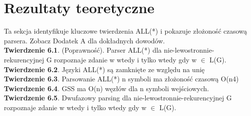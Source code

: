 \section{Rezultaty teoretyczne}
Ta sekcja identyfikuje kluczowe twierdzenia ALL(*) i pokazuje złożoność czasową parsera.
Zobacz Dodatek A dla dokładnych dowodów.
\\
\textbf{Twierdzenie 6.1}. (Poprawność). Parser ALL(*) dla nie-lewostronnie-rekurencyjnej
G rozpoznaje zdanie w wtedy i tylko wtedy gdy w $\in$ L(G).
\\
\textbf{Twierdzenie 6.2}. Języki ALL(*) są zamknięte ze względu na unię
\\
\textbf{Twierdzenie 6.3}. Parsowanie ALL(*) n symboli ma złożoność czasową O(n4)
\\
\textbf{Twierdzenie 6.4}. GSS ma O(n) węzłów dla n symboli wejściowych.
\\
\textbf{Twierdzenie 6.5}. Dwufazowy parsing dla nie-lewostronnie-rekurencyjnej G rozpoznaje
zdanie w wtedy i tylko wtedy gdy w $\in$ L(G).
